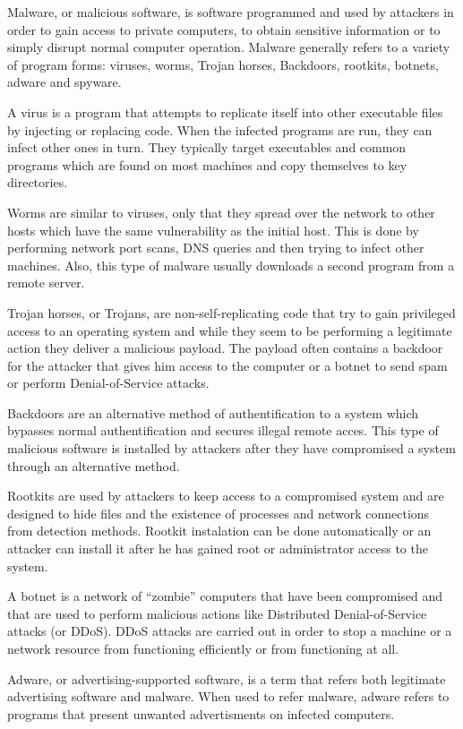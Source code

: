 Malware, or malicious software, is software programmed and used by attackers in order to gain access to private computers, to obtain sensitive information or to simply disrupt normal computer operation. Malware generally refers to a variety of program forms: viruses, worms, Trojan horses, Backdoors, rootkits, botnets, adware and spyware.

A virus is a program that attempts to replicate itself into other executable files by injecting or replacing code. When the infected programs are run, they can infect other ones in turn. They typically target executables and common programs which are found on most machines and copy themselves to key directories.

Worms are similar to viruses, only that they spread over the network to other hosts which have the same vulnerability as the initial host. This is done by performing network port scans, DNS queries and then trying to infect other machines. Also, this type of malware usually downloads a second program from a remote server.

Trojan horses, or Trojans, are non-self-replicating code that try to gain privileged access to an operating system and while they seem to be performing a legitimate action they deliver a malicious payload. The payload often contains a backdoor for the attacker that gives him access to the computer or a botnet to send spam or perform Denial-of-Service attacks.

Backdoors are an alternative method of authentification to a system which bypasses normal authentification and secures illegal remote acces. This type of malicious software is installed by attackers after they have compromised a system through an alternative method.

Rootkits are used by attackers to keep access to a compromised system and are designed to hide files and the existence of processes and network connections from detection methods. Rootkit instalation can be done automatically or an attacker can install it after he has gained root or administrator access to the system.

A botnet is a network of ``zombie'' computers that have been compromised and that are used to perform malicious actions like Distributed Denial-of-Service attacks (or DDoS). DDoS attacks are carried out in order to stop a machine or a network resource from functioning efficiently or from functioning at all.

Adware, or advertising-supported software, is a term that refers both legitimate advertising software and malware. When used to refer malware, adware refers to programs that present unwanted advertisments on infected computers.

